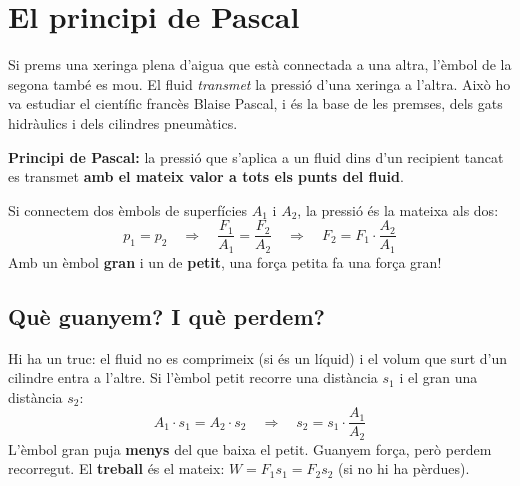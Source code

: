 \section{El principi de Pascal}

Si prems una xeringa plena d'aigua que està connectada a una altra, l'èmbol de la segona també es mou. El fluid \emph{transmet} la pressió d'una xeringa a l'altra. Això ho va estudiar el científic francès Blaise Pascal, i és la base de les premses, dels gats hidràulics i dels cilindres pneumàtics.

\begin{idea}
\textbf{Principi de Pascal:} la pressió que s'aplica a un fluid dins d'un recipient tancat es transmet \textbf{amb el mateix valor a tots els punts del fluid}.

Si connectem dos èmbols de superfícies $A_1$ i $A_2$, la pressió és la mateixa als dos:
\[ p_1 = p_2 \quad\Rightarrow\quad \frac{F_1}{A_1} = \frac{F_2}{A_2} \quad\Rightarrow\quad F_2 = F_1 \cdot \frac{A_2}{A_1} \]
Amb un èmbol \textbf{gran} i un de \textbf{petit}, una força petita fa una força gran!
\end{idea}

\begin{center}
\end{center}

\subsection*{Què guanyem? I què perdem?}

Hi ha un truc: el fluid no es comprimeix (si és un líquid) i el volum que surt d'un cilindre entra a l'altre. Si l'èmbol petit recorre una distància $s_1$ i el gran una distància $s_2$:
\[ A_1 \cdot s_1 = A_2 \cdot s_2 \quad\Rightarrow\quad s_2 = s_1 \cdot \frac{A_1}{A_2} \]
L'èmbol gran puja \textbf{menys} del que baixa el petit. Guanyem força, però perdem recorregut. El \textbf{treball} és el mateix: $W = F_1 s_1 = F_2 s_2$ (si no hi ha pèrdues).

